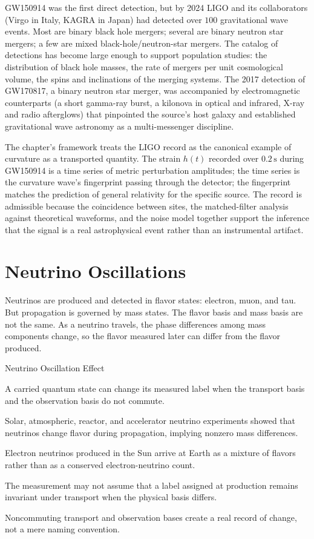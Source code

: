 GW150914 was the first direct detection, but by 2024 LIGO and its
collaborators (Virgo in Italy, KAGRA in Japan) had detected over $100$
gravitational wave events. Most are binary black hole mergers; several
are binary neutron star mergers; a few are mixed black-hole/neutron-star
mergers. The catalog of detections has become large enough to support
population studies: the distribution of black hole masses, the rate of
mergers per unit cosmological volume, the spins and inclinations of the
merging systems. The 2017 detection of GW170817, a binary neutron star
merger, was accompanied by electromagnetic counterparts (a short gamma-ray
burst, a kilonova in optical and infrared, X-ray and radio afterglows)
that pinpointed the source's host galaxy and established gravitational
wave astronomy as a multi-messenger discipline.

The chapter's framework treats the LIGO record as the canonical example
of curvature as a transported quantity. The strain $h(t)$ recorded over
$0{.}2\,\mathrm{s}$ during GW150914 is a time series of metric
perturbation amplitudes; the time series is the curvature wave's
fingerprint passing through the detector; the fingerprint matches the
prediction of general relativity for the specific source. The record is
admissible because the coincidence between sites, the matched-filter
analysis against theoretical waveforms, and the noise model together
support the inference that the signal is a real astrophysical event
rather than an instrumental artifact.

\section{Neutrino Oscillations}
\label{se:neutrino-oscillations}

Neutrinos are produced and detected in flavor states: electron, muon, and tau.
But propagation is governed by mass states. The flavor basis and mass basis are
not the same. As a neutrino travels, the phase differences among mass
components change, so the flavor measured later can differ from the flavor
produced.

\begin{phenom}{Neutrino Oscillation Effect}
\label{ph:neutrino-oscillation-effect}

\PhStatement A carried quantum state can change its measured label when the
transport basis and the observation basis do not commute.

\PhOrigin Solar, atmospheric, reactor, and accelerator neutrino experiments
showed that neutrinos change flavor during propagation, implying nonzero mass
differences.

\PhObservation Electron neutrinos produced in the Sun arrive at Earth as a
mixture of flavors rather than as a conserved electron-neutrino count.

\PhConstraint The measurement may not assume that a label assigned at
production remains invariant under transport when the physical basis differs.

\PhConsequence Noncommuting transport and observation bases create a real
record of change, not a mere naming convention.

\end{phenom}

